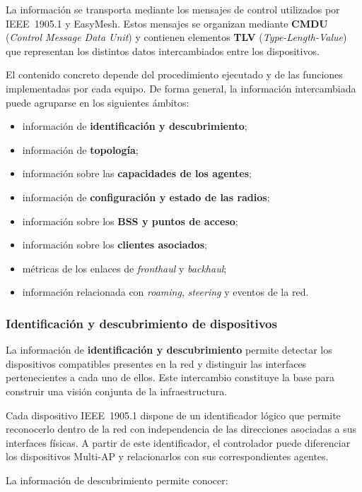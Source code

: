 La información se transporta mediante los mensajes de control utilizados
por IEEE~1905.1 y EasyMesh. Estos mensajes se organizan mediante
\textbf{CMDU} (\textit{Control Message Data Unit}) y contienen elementos
\textbf{TLV} (\textit{Type-Length-Value}) que representan los distintos
datos intercambiados entre los dispositivos.

El contenido concreto depende del procedimiento ejecutado y de las
funciones implementadas por cada equipo. De forma general, la información
intercambiada puede agruparse en los siguientes ámbitos:

\begin{itemize}
    \item información de \textbf{identificación y descubrimiento};
    \item información de \textbf{topología};
    \item información sobre las \textbf{capacidades de los agentes};
    \item información de \textbf{configuración y estado de las radios};
    \item información sobre los \textbf{BSS y puntos de acceso};
    \item información sobre los \textbf{clientes asociados};
    \item métricas de los enlaces de \textit{fronthaul} y
    \textit{backhaul};
    \item información relacionada con \textit{roaming},
    \textit{steering} y eventos de la red.
\end{itemize}


\subsubsection*{Identificación y descubrimiento de dispositivos}

La información de \textbf{identificación y descubrimiento} permite
detectar los dispositivos compatibles presentes en la red y distinguir
las interfaces pertenecientes a cada uno de ellos. Este intercambio
constituye la base para construir una visión conjunta de la
infraestructura.

Cada dispositivo IEEE~1905.1 dispone de un identificador lógico que
permite reconocerlo dentro de la red con independencia de las
direcciones asociadas a sus interfaces físicas. A partir de este
identificador, el controlador puede diferenciar los dispositivos
Multi-AP y relacionarlos con sus correspondientes agentes.

La información de descubrimiento permite conocer:


